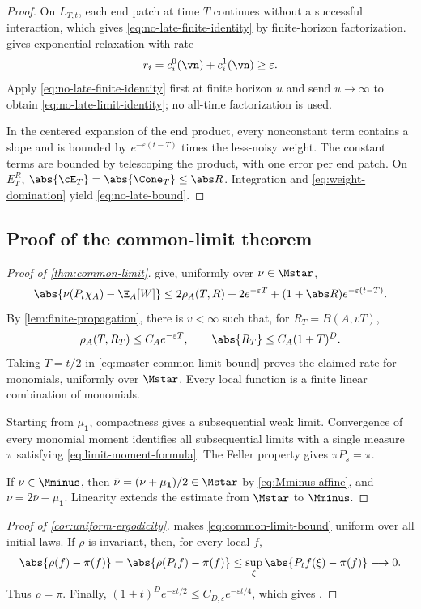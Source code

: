 \begin{proof}
On \(L_{T,t}\), each end patch at time \(T\) continues without a
successful interaction, which gives
\eqref{eq:no-late-finite-identity} by finite-horizon factorization.
 gives exponential relaxation with
rate
\[
  r_i=c_i^0(\vn)+c_i^1(\vn)\ge\varepsilon.
\]
Apply \eqref{eq:no-late-finite-identity} first at finite horizon \(u\)
and send \(u\to\infty\) to obtain
\eqref{eq:no-late-limit-identity}; no all-time factorization is used.

In the centered expansion of the end product, every nonconstant term
contains a slope and is bounded by
\(e^{-\varepsilon(t-T)}\) times the less-noisy weight. The constant
terms are bounded by telescoping the product, with one error per end
patch. On \(E_T^R\),
\(\abs{\cE_T}=\abs{\Cone_T}\le\abs R\). Integration and
\eqref{eq:weight-domination} yield \eqref{eq:no-late-bound}.
\end{proof}

\subsection{Proof of the common-limit theorem}

\begin{proof}[Proof of \cref{thm:common-limit}]
give, uniformly over \(\nu\in\Mstar\),
\begin{equation}
  \abs{\nu(P_t\chi_A)-\E_A[W]}
  \le
  2\rho_A(T,R)
  +
  2e^{-\varepsilon T}
  +
  (1+\abs R)e^{-\varepsilon(t-T)}.
  \label{eq:master-common-limit-bound}
\end{equation}
By \cref{lem:finite-propagation}, there is \(v<\infty\) such that, for
\(R_T=B(A,vT)\),
\[
  \rho_A(T,R_T)\le C_Ae^{-\varepsilon T},
  \qquad
  \abs{R_T}\le C_A(1+T)^D.
\]
Taking \(T=t/2\) in \eqref{eq:master-common-limit-bound} proves the
claimed rate for monomials, uniformly over \(\Mstar\). Every local
function is a finite linear combination of monomials.

Starting from \(\mu_{\mathbf1}\), compactness gives a subsequential
weak limit. Convergence of every monomial moment identifies all
subsequential limits with a single measure \(\pi\) satisfying
\eqref{eq:limit-moment-formula}. The Feller property gives
\(\pi P_s=\pi\).

If \(\nu\in\Mminus\), then
\(\bar\nu=(\nu+\mu_{\mathbf1})/2\in\Mstar\) by
\eqref{eq:Mminus-affine}, and
\(\nu=2\bar\nu-\mu_{\mathbf1}\). Linearity extends the estimate from
\(\Mstar\) to \(\Mminus\).
\end{proof}

\begin{proof}[Proof of \cref{cor:uniform-ergodicity}]
 makes
\eqref{eq:common-limit-bound} uniform over all initial laws. If
\(\rho\) is invariant, then, for every local \(f\),
\[
  \abs{\rho(f)-\pi(f)}
  =
  \abs{\rho(P_tf)-\pi(f)}
  \le
  \sup_\xi\abs{P_tf(\xi)-\pi(f)}
  \longrightarrow0.
\]
Thus \(\rho=\pi\). Finally,
\((1+t)^De^{-\varepsilon t/2}\le C_{D,\varepsilon}
e^{-\varepsilon t/4}\), which gives
\uniformexponentialergodicity.
\end{proof}
